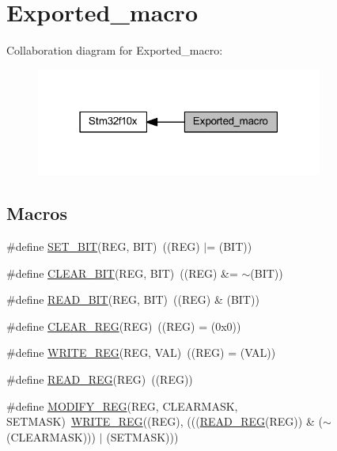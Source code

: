 \hypertarget{group___exported__macro}{}\section{Exported\+\_\+macro}
\label{group___exported__macro}
Collaboration diagram for Exported\+\_\+macro\+:
\nopagebreak
\begin{figure}[H]
\begin{center}
\leavevmode
\includegraphics[width=267pt]{group___exported__macro}
\end{center}
\end{figure}
\subsection*{Macros}
\begin{DoxyCompactItemize}
\item 
\#define \hyperlink{group___exported__macro_ga26474f43799fbade9cf300e21dd3a91a}{S\+E\+T\+\_\+\+B\+IT}(R\+EG,  B\+IT)~((R\+EG) $\vert$= (B\+IT))
\item 
\#define \hyperlink{group___exported__macro_ga133aae6fc0d41bffab39ab223a7001de}{C\+L\+E\+A\+R\+\_\+\+B\+IT}(R\+EG,  B\+IT)~((R\+EG) \&= $\sim$(B\+IT))
\item 
\#define \hyperlink{group___exported__macro_ga822bb1bb9710d5f2fa6396b84e583c33}{R\+E\+A\+D\+\_\+\+B\+IT}(R\+EG,  B\+IT)~((R\+EG) \& (B\+IT))
\item 
\#define \hyperlink{group___exported__macro_ga1378fbdda39f40b85420df55f41460ef}{C\+L\+E\+A\+R\+\_\+\+R\+EG}(R\+EG)~((R\+EG) = (0x0))
\item 
\#define \hyperlink{group___exported__macro_ga32f78bffcaf6d13023dcd7f05e0c4d57}{W\+R\+I\+T\+E\+\_\+\+R\+EG}(R\+EG,  V\+AL)~((R\+EG) = (V\+AL))
\item 
\#define \hyperlink{group___exported__macro_gae7f188a4d26c9e713a48414783421071}{R\+E\+A\+D\+\_\+\+R\+EG}(R\+EG)~((R\+EG))
\item 
\#define \hyperlink{group___exported__macro_ga6553c99f510c3bab8cc0a91602053247}{M\+O\+D\+I\+F\+Y\+\_\+\+R\+EG}(R\+EG,  C\+L\+E\+A\+R\+M\+A\+SK,  S\+E\+T\+M\+A\+SK)~\hyperlink{group___exported__macro_ga32f78bffcaf6d13023dcd7f05e0c4d57}{W\+R\+I\+T\+E\+\_\+\+R\+EG}((R\+EG), (((\hyperlink{group___exported__macro_gae7f188a4d26c9e713a48414783421071}{R\+E\+A\+D\+\_\+\+R\+EG}(R\+EG)) \& ($\sim$(C\+L\+E\+A\+R\+M\+A\+SK))) $\vert$ (S\+E\+T\+M\+A\+SK)))
\end{DoxyCompactItemize}


